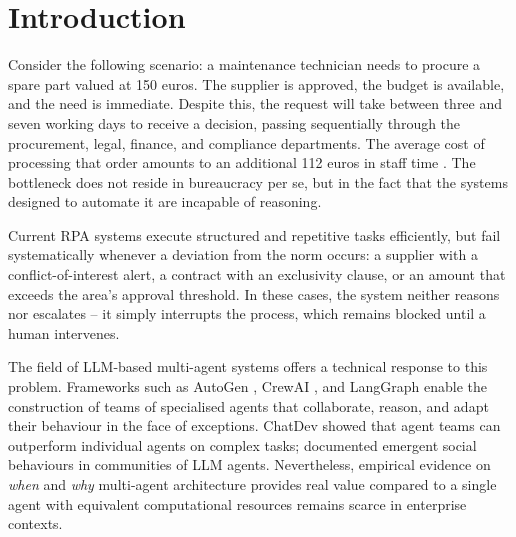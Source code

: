 \documentclass[preprint,12pt,authoryear]{elsarticle}
\begin{document}
\section{Introduction}
\label{sec:introduction}

Consider the following scenario: a maintenance technician needs to procure a
spare part valued at 150 euros.
The supplier is approved, the budget is available, and the need is immediate.
Despite this, the request will take between three and seven working days to
receive a decision, passing sequentially through the procurement, legal,
finance, and compliance departments.
The average cost of processing that order amounts to an additional 112 euros in
staff time \citep{hackett2023}.
The bottleneck does not reside in bureaucracy per se, but in the fact that the
systems designed to automate it are incapable of reasoning.

Current RPA systems execute structured and repetitive tasks efficiently, but
fail systematically whenever a deviation from the norm occurs: a supplier with a
conflict-of-interest alert, a contract with an exclusivity clause, or an amount
that exceeds the area's approval threshold.
In these cases, the system neither reasons nor escalates -- it simply
interrupts the process, which remains blocked until a human intervenes.

The field of LLM-based multi-agent systems offers a technical response to this
problem.
Frameworks such as AutoGen \citep{wu2023autogen}, CrewAI \citep{crewai2024},
and LangGraph enable the construction of teams of specialised agents that
collaborate, reason, and adapt their behaviour in the face of exceptions.
ChatDev \citep{qian2023chatdev} showed that agent teams can outperform
individual agents on complex tasks; \citet{park2023generative} documented
emergent social behaviours in communities of LLM agents.
Nevertheless, empirical evidence on \emph{when} and \emph{why} multi-agent
architecture provides real value compared to a single agent with equivalent
computational resources remains scarce in enterprise contexts.
\end{document}
